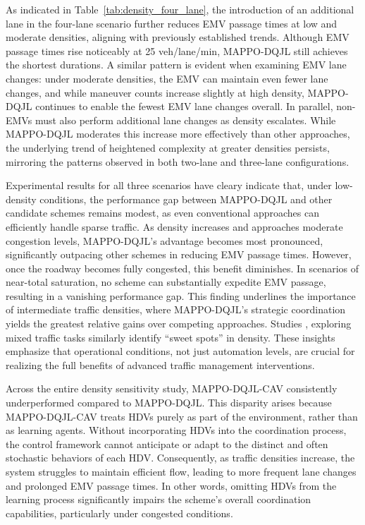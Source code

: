 As indicated in Table~\ref{tab:density_four_lane}, the introduction of an additional lane in the four-lane scenario further reduces EMV passage times at low and moderate densities, aligning with previously established trends. Although EMV passage times rise noticeably at 25 veh/lane/min, MAPPO-DQJL still achieves the shortest durations. A similar pattern is evident when examining EMV lane changes: under moderate densities, the EMV can maintain even fewer lane changes, and while maneuver counts increase slightly at high density, MAPPO-DQJL continues to enable the fewest EMV lane changes overall. In parallel, non-EMVs must also perform additional lane changes as density escalates. While MAPPO-DQJL moderates this increase more effectively than other approaches, the underlying trend of heightened complexity at greater densities persists, mirroring the patterns observed in both two-lane and three-lane configurations.

Experimental results for all three scenarios have cleary indicate that, under low-density conditions, the performance gap between MAPPO-DQJL and other candidate schemes remains modest, as even conventional approaches can efficiently handle sparse traffic. As density increases and approaches moderate congestion levels, MAPPO-DQJL’s advantage becomes most pronounced, significantly outpacing other schemes in reducing EMV passage times. However, once the roadway becomes fully congested, this benefit diminishes. In scenarios of near-total saturation, no scheme can substantially expedite EMV passage, resulting in a vanishing performance gap. This finding underlines the importance of intermediate traffic densities, where MAPPO-DQJL’s strategic coordination yields the greatest relative gains over competing approaches. Studies \cite{stern2018dissipation, wang2015caccdensity, feng2021densityimpact}, exploring mixed traffic tasks similarly identify “sweet spots” in density. These insights emphasize that operational conditions, not just automation levels, are crucial for realizing the full benefits of advanced traffic management interventions.

Across the entire density sensitivity study, MAPPO-DQJL-CAV consistently underperformed compared to MAPPO-DQJL. This disparity arises because MAPPO-DQJL-CAV treats HDVs purely as part of the environment, rather than as learning agents. Without incorporating HDVs into the coordination process, the control framework cannot anticipate or adapt to the distinct and often stochastic behaviors of each HDV. Consequently, as traffic densities increase, the system struggles to maintain efficient flow, leading to more frequent lane changes and prolonged EMV passage times. In other words, omitting HDVs from the learning process significantly impairs the scheme’s overall coordination capabilities, particularly under congested conditions. 

